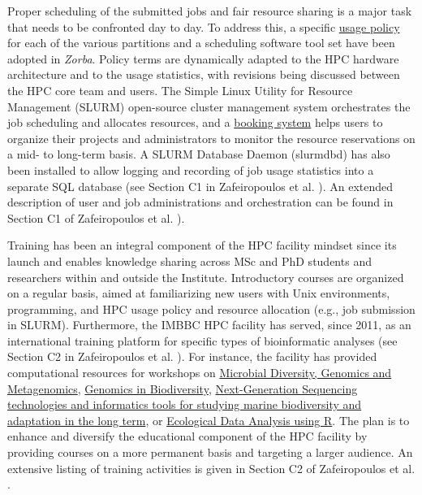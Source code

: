    Proper scheduling of the submitted jobs and fair resource sharing is a major task that needs to be confronted day to day. 
   To address this, a specific \href{https://hpc.hcmr.gr/docs/getting-started/policy/}{usage policy} for each of the various partitions and a scheduling software tool set have been adopted in \textit{Zorba}. 
   Policy terms are dynamically adapted to the HPC hardware architecture and to the usage statistics, with revisions being discussed between the HPC core team and users. 
   The Simple Linux Utility for Resource Management (SLURM) open-source cluster management system orchestrates the job scheduling and allocates resources, and a \href{https://booking-hpc.hcmr.gr/day.php}{booking system} helps users to organize their projects and administrators to monitor the resource reservations on a mid- to long-term basis. 
   A SLURM Database Daemon (slurmdbd) has also been installed to allow logging and recording of job usage statistics into a separate SQL database (see Section C1 in Zafeiropoulos et al.  \citep{haris_zafeiropoulos_2021_4665308}). 
   An extended description of user and job administrations and orchestration can be found in Section C1 of Zafeiropoulos et al. \citep{haris_zafeiropoulos_2021_4665308}).

   Training has been an integral component of the HPC facility mindset since its launch and enables knowledge sharing across MSc and PhD students and researchers within and outside the Institute. 
   Introductory courses are organized on a regular basis, aimed at familiarizing new users with Unix environments, programming, and HPC usage policy and resource allocation (e.g., job submission in SLURM).
   Furthermore, the IMBBC HPC facility has served, since 2011, as an international training platform for specific types of bioinformatic analyses (see Section C2 in Zafeiropoulos et al. \citep{haris_zafeiropoulos_2021_4665308}). 
   For instance, the facility has provided computational resources for workshops on 
   \href{http://www.marbigen.org/content/microbial-diversity-genomics-and-metagenomics}{Microbial Diversity, Genomics and Metagenomics}, 
   \href{http://www.marbigen.org/content/workshop-genomics-biodiversity}{Genomics in Biodiversity},
   \href{https://sites.google.com/site/workshopimbg/}{Next-Generation Sequencing technologies and informatics tools for studying marine biodiversity and adaptation in the long term}, or
   \href{https://summer-schools.aegean.gr/EcoDAR2014}{Ecological Data Analysis using R}. 
   The plan is to enhance and diversify the educational component of the HPC facility by providing courses on a more permanent basis and targeting a larger audience. 
   An extensive listing of training activities is given in Section C2 of Zafeiropoulos et al. \citep{haris_zafeiropoulos_2021_4665308}.


